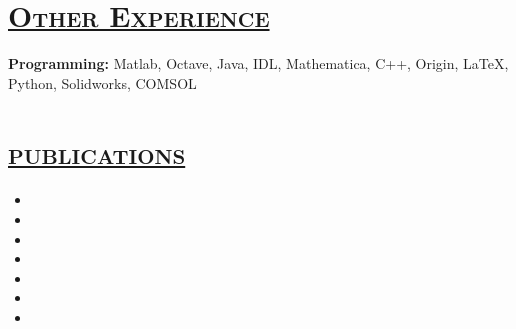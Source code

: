 \documentclass[12pt]{article}
\begin{document}
\section*{\Large{\underline{\textsc{Other Experience}}}}
\vspace{0.1in}
	{\bf Programming:} Matlab, Octave, Java, IDL, Mathematica, C++, Origin,
	\LaTeX, Python, Solidworks, COMSOL\\

\section*{\Large{\underline{\textsc{publications}}}}
\vspace{0.1in} 
	\begin{itemize}
			\vspace{-0.1cm}
		\itemsep=-0.3em
		\item{}
		\item{}
		\item{}
		\item{}
		\item{}
		\item{}
		\item{}
	\end{itemize}
\end{document}
